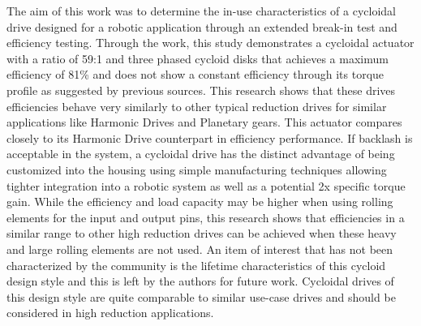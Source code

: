 The aim of this work was to determine the in-use characteristics of a cycloidal drive designed for a robotic application through an extended break-in test and efficiency testing. Through the work, this study demonstrates a cycloidal actuator with a ratio of 59:1 and three phased cycloid disks that achieves a maximum efficiency of 81\% and does not show a constant efficiency through its torque profile as suggested by previous sources.
This research shows that these drives efficiencies behave very similarly to other typical reduction drives for similar applications like Harmonic Drives and Planetary gears.
This actuator compares closely to its Harmonic Drive counterpart in efficiency performance.
If backlash is acceptable in the system, a cycloidal drive has the distinct advantage of being customized into the housing using simple manufacturing techniques allowing tighter integration into a robotic system as well as a potential 2x specific torque gain.
While the efficiency and load capacity may be higher when using rolling elements for the input and output pins, this research shows that efficiencies in a similar range to other high reduction drives can be achieved when these heavy and large rolling elements are not used.
An item of interest that has not been characterized by the community is the lifetime characteristics of this cycloid design style and this is left by the authors for future work.
Cycloidal drives of this design style are quite comparable to similar use-case drives and should be considered in high reduction applications.


